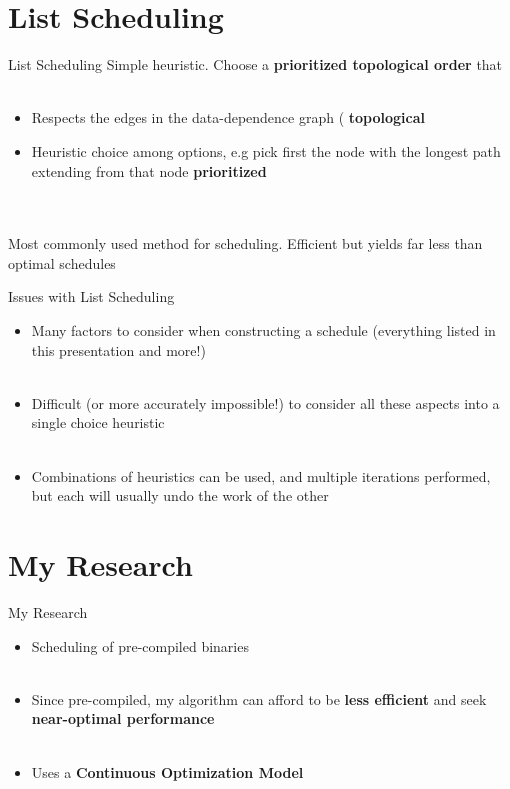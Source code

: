 \documentclass{beamer}
\begin{document}
\begin{darkframes}
\section{List Scheduling}
\begin{frame}{List Scheduling}
	Simple heuristic.  Choose a {\bf \color{cyan} prioritized topological order} that \\
	\qquad \\
	\begin{itemize}
		\item Respects the edges in the data-dependence graph ({\bf \color{green} topological}
		\item Heuristic choice among options, e.g pick first the node with the longest path extending from that node {\bf \color{green} prioritized}
	\end{itemize}
	\qquad \\
	\qquad \\
	Most commonly used method for scheduling. Efficient but yields far less than optimal schedules
\end{frame}

\begin{frame}{Issues with List Scheduling}

    \begin{itemize}
        \item Many factors to consider when constructing a schedule (everything listed in this presentation and more!) \\
        \qquad \\
        \pause
        \item Difficult (or more accurately impossible!) to consider all these aspects into a single choice heuristic \\
        \qquad \\
        \pause
        \item Combinations of heuristics can be used, and multiple iterations performed, but each will usually undo the work of the other
    \end{itemize}
\end{frame}

\section{My Research}
\begin{frame}{My Research}

    \begin{itemize}
        \item Scheduling of pre-compiled binaries \\
        \qquad \\
        \pause
        \item Since pre-compiled, my algorithm can afford to be {\bf \color{green} less efficient} and seek {\bf \color{green} near-optimal performance} \\
        \qquad \\
        \pause
        \item Uses a {\bf \color{green} Continuous Optimization Model}
    \end{itemize}
\end{frame}


\end{darkframes}
\end{document}

